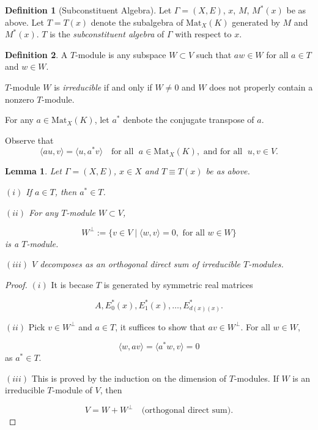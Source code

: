 \documentclass[
]{book}
\newtheorem{lemma}{Lemma}[chapter]
\theoremstyle{definition}
\newtheorem{definition}{Definition}[chapter]
\theoremstyle{definition}
\theoremstyle{definition}
\theoremstyle{definition}
\theoremstyle{remark}
\begin{document}
\begin{definition}[Subconstituent Algebra]
Let \(\Gamma = (X, E)\), \(x\), \(M\), \(M^*(x)\) be as above. Let \(T = T(x)\) denote the subalgebra of \(\mathrm{Mat}_X(K)\) generated by \(M\) and \(M^*(x)\). \(T\) is the \emph{subconstituent algebra} of \(\Gamma\) with respect to \(x\).
\end{definition}

\begin{definition}
A \(T\)-module  is any subspace \(W\subset V\) such that \(aw\in W\) for all \(a\in T\) and \(w\in W\).

\(T\)-module \(W\) is \emph{irreducible} if and only if \(W\neq 0\) and \(W\) does not properly contain a nonzero \(T\)-module.
\end{definition}

For any \(a\in \mathrm{Mat}_X(K)\), let \(a^*\) denbote the conjugate transpose of \(a\).

Observe that
\[\langle au, v\rangle = \langle u, a^*v\rangle \quad \textrm{for all }\; a\in \mathrm{Mat}_X(K), \textrm{ and for all } \; u,v\in V.\]

\begin{lemma}

Let \(\Gamma = (X,E)\), \(x\in X\) and \(T \equiv T(x)\) be as above.

\((i)\) If \(a\in T\), then \(a^*\in T\).

\((ii)\) For any \(T\)-module \(W\subset V\),

\[W^\bot := \{v\in V\mid \langle w, v\rangle = 0, \textrm{ for all }w\in W\}\]
is a \(T\)-module.

\((iii)\) \(V\) decomposes as an orthogonal direct sum of irreducible \(T\)-modules.

\end{lemma}

\begin{proof}
\leavevmode

\((i)\) It is becase \(T\) is generated by symmetric real matrices

\[A, E^*_0(x), E^*_1(x), \ldots, E^*_{d(x)(x)}.\]

\((ii)\) Pick \(v\in W^\bot\) and \(a\in T\), it suffices to show that \(av\in W^\bot\). For all \(w\in W\),

\[\langle w, av\rangle = \langle a^*w, v\rangle = 0\]
as \(a^*\in T\).

\((iii)\) This is proved by the induction on the dimension of \(T\)-modules. If \(W\) is an irreducible \(T\)-module of \(V\), then

\[V = W + W^\bot \quad \textrm{(orthogonal direct sum)}.\]

\end{proof}
\end{document}
